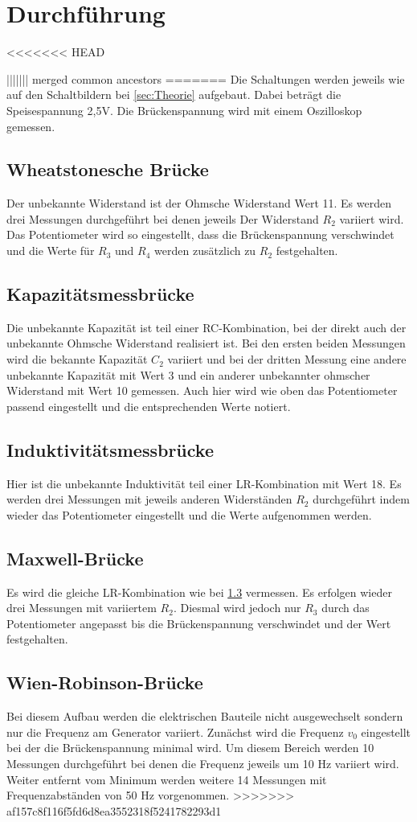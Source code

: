 \section{Durchführung}
\label{sec:Durchführung}
<<<<<<< HEAD




||||||| merged common ancestors
=======
Die Schaltungen werden jeweils wie auf den Schaltbildern bei 
\ref{sec:Theorie} aufgebaut. Dabei beträgt die
Speisespannung 2,5V. Die Brückenspannung wird
mit einem Oszilloskop gemessen.
\subsection{Wheatstonesche Brücke}
Der unbekannte Widerstand ist der Ohmsche Widerstand Wert 11.
Es werden drei Messungen durchgeführt bei denen jeweils Der Widerstand $R_2$
variiert wird. Das Potentiometer wird so eingestellt,
dass die Brückenspannung verschwindet und die Werte
für $R_3$ und $R_4$ werden zusätzlich zu $R_2$ festgehalten.
\subsection{Kapazitätsmessbrücke}
Die unbekannte Kapazität ist teil einer RC-Kombination,
bei der direkt auch der unbekannte Ohmsche Widerstand realisiert ist.
Bei den ersten beiden Messungen wird die bekannte Kapazität $C_2$ variiert
und bei der dritten Messung eine andere unbekannte Kapazität mit Wert 3
und ein anderer unbekannter ohmscher Widerstand mit Wert 10 gemessen.
Auch hier wird wie oben das Potentiometer passend eingestellt und die
entsprechenden Werte notiert.
\subsection{Induktivitätsmessbrücke}
\label{sec:Indu}
Hier ist die unbekannte Induktivität teil einer LR-Kombination
mit Wert 18. Es werden drei Messungen mit jeweils anderen Widerständen $R_2$
durchgeführt indem wieder das Potentiometer eingestellt und die Werte aufgenommen werden.
\subsection{Maxwell-Brücke}
Es wird die gleiche LR-Kombination wie bei \ref{sec:Indu} vermessen.
Es erfolgen wieder drei Messungen mit variiertem $R_2$. Diesmal
wird jedoch nur $R_3$ durch das Potentiometer angepasst bis die
Brückenspannung verschwindet und der Wert festgehalten.

\subsection{Wien-Robinson-Brücke}
Bei diesem Aufbau werden die elektrischen Bauteile
nicht ausgewechselt sondern nur die Frequenz am 
Generator variiert. Zunächst wird die Frequenz $v_0$ eingestellt
bei der die Brückenspannung minimal wird. Um diesem Bereich werden
10 Messungen durchgeführt bei denen die Frequenz jeweils um 10 Hz
variiert wird. Weiter entfernt vom Minimum werden weitere 14 Messungen
mit Frequenzabständen von 50 Hz vorgenommen.
>>>>>>> af157c8f116f5fd6d8ea3552318f5241782293d1
